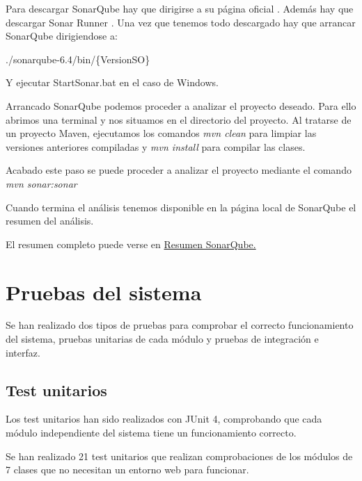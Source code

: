 Para descargar SonarQube hay que dirigirse a su página oficial \cite{down:sonq}. Además hay que descargar Sonar Runner \cite{down:sonr}. Una vez que tenemos todo descargado hay que arrancar SonarQube dirigiendose a:

./sonarqube-6.4/bin/\{VersionSO\}

Y ejecutar StartSonar.bat en el caso de Windows.


Arrancado SonarQube podemos proceder a analizar el proyecto deseado. Para ello abrimos una terminal y nos situamos en el directorio del proyecto. Al tratarse de un proyecto Maven, ejecutamos los comandos \emph{mvn clean} para limpiar las versiones anteriores compiladas y \emph{mvn install} para compilar las clases.


Acabado este paso se puede proceder a analizar el proyecto mediante el comando \emph{mvn sonar:sonar}


Cuando termina el análisis tenemos disponible en la página local de SonarQube el resumen del análisis.


El resumen completo puede verse en \href{https://sonarcloud.io/dashboard?id=UBUassistant}{Resumen SonarQube.}

\section{Pruebas del sistema}

Se han realizado dos tipos de pruebas para comprobar el correcto funcionamiento del sistema, pruebas unitarias de cada módulo y pruebas de integración e interfaz.

\subsection{Test unitarios}

Los test unitarios han sido realizados con JUnit 4, comprobando que cada módulo independiente del sistema tiene un funcionamiento correcto.

Se han realizado 21 test unitarios que realizan comprobaciones de los módulos de 7 clases que no necesitan un entorno web para funcionar. 

